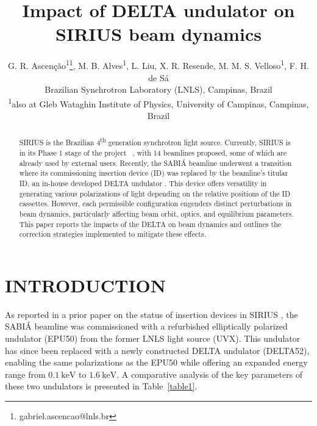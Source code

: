 \documentclass[a4paper,
               keeplastbox,   %
               ]{jacow}
\begin{document}
\title{Impact of DELTA undulator on SIRIUS beam dynamics }

\author{G. R. Ascenção\textsuperscript{1}\thanks{gabriel.ascencao@lnls.br}, M. B. Alves\textsuperscript{1}, L. Liu, X. R. Resende, M. M. S. Velloso\textsuperscript{1}, F. H. de Sá\\ Brazilian Synchrotron Laboratory (LNLS), Campinas, Brazil \\
\textsuperscript{1}also at Gleb Wataghin Institute of Physics, University of Campinas, Campinas, Brazil
}

	
\maketitle
%
\begin{abstract}
SIRIUS is the Brazilian 4\textsuperscript{th} generation synchrotron light source. Currently, SIRIUS is in its Phase 1 stage of the project ~\cite{Liu:IPAC23-WEOGA2, Beamlines}, with 14 beamlines proposed, some of which are already used by external users. Recently, the SABIÁ beamline underwent a transition where its commissioning insertion device (ID) was replaced by the beamline's titular ID, an in-house developed DELTA undulator  \cite{Vilela:IPAC17-WEPIK053, Vilela:IPAC18-TUPMK003}. This device offers versatility in generating various polarizations of light depending on the relative positions of the ID cassettes. However,  each permissible configuration engenders distinct perturbations in beam dynamics, particularly affecting beam orbit, optics, and equilibrium parameters. This paper reports the impacts of the DELTA on beam dynamics and outlines the correction strategies implemented to mitigate these effects.
\end{abstract}


\section{INTRODUCTION}
As reported in a prior paper on the status of insertion devices in SIRIUS \cite{Ascenção:IPAC23-MOPM088}, the SABIÁ beamline was commissioned with a refurbished elliptically polarized undulator (EPU50) from the former LNLS light source (UVX). This undulator has since been replaced with a newly constructed DELTA undulator (DELTA52), enabling the same polarizations as the EPU50 while offering an expanded energy range from $\SI{0.1}{\kilo\electronvolt}$ to $\SI{1.6}{\kilo\electronvolt}$. A comparative analysis of the key parameters of these two undulators is presented in Table~\ref{table1}.
\end{document}
